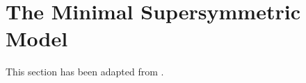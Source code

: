 \chapter{The Minimal Supersymmetric Model}
\label{chap:mssm}

This section has been adapted from \cite{susyprimer}.
